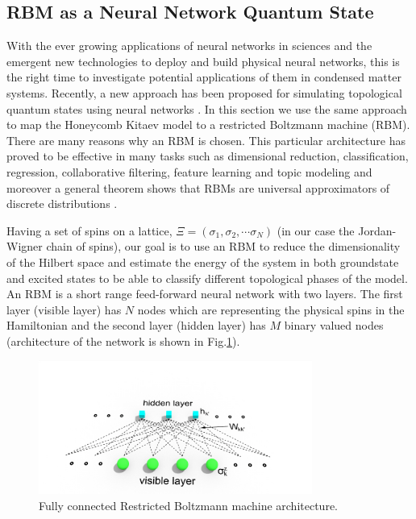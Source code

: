 \documentclass{article}
\begin{document}
\subsection{RBM as a Neural Network Quantum State}

With the ever growing applications of neural networks in sciences and the emergent new technologies to deploy and build physical neural networks, this is the right time to investigate potential applications of them in condensed matter systems. Recently, a new approach has been proposed for simulating topological quantum states using neural networks \cite{Deng_2017}. In this section we use the same approach to map the Honeycomb Kitaev model to a restricted Boltzmann machine (RBM). There are many reasons why an RBM is chosen. This particular architecture has proved to be effective in many tasks such as dimensional reduction, classification, regression, collaborative filtering, feature learning and topic modeling and moreover a general theorem shows that RBMs are universal approximators of discrete distributions \cite{LeRouxBengio}.

Having a set of spins on a lattice, $\Xi=(\sigma_{1},\sigma_{2},\cdots\sigma_{N})$ (in our case the Jordan-Wigner chain of spins), our goal is to use an RBM to reduce the dimensionality of the Hilbert space and estimate the energy of the system in both groundstate and excited states to be able to classify different topological phases of the model. An RBM is a short range feed-forward neural network with two layers. The first layer (visible layer) has $N$ nodes which are representing the physical spins in the Hamiltonian and the second layer (hidden layer) has $M$ binary valued nodes (architecture of the network is shown in Fig.\ref{rbm-arc}). 

\begin{figure}[!htb]
	\centering
	\includegraphics[width=0.8\textwidth]{./images/rbm}
	\caption{\label{rbm-arc} Fully connected Restricted Boltzmann machine architecture.}
\end{figure}
\end{document}
